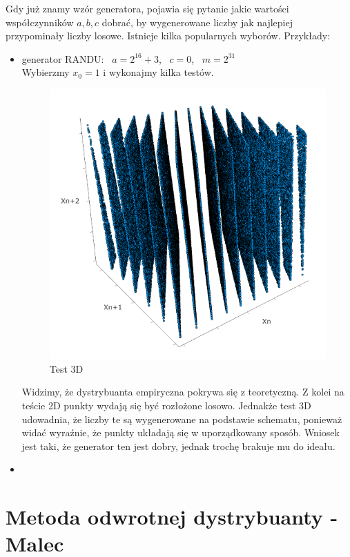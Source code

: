 \documentclass[12pt]{mwrep}
\begin{document}
	\noindent Gdy już znamy wzór generatora, pojawia się pytanie jakie wartości współczynników $a, b, c$ dobrać, by wygenerowane liczby jak najlepiej przypominały liczby losowe. Istnieje kilka popularnych wyborów. Przykłady:
	\begin{itemize}[leftmargin=10mm]
		\item generator RANDU: \ $a = 2^{16} + 3$, \ $c = 0$, \ $m = 2^{31}$\\
		Wybierzmy $x_0 = 1$ i wykonajmy kilka testów.
		\begin{figure}[H]
			\centering
			\caption{Test 3D}
			\includegraphics[scale=1]{fig/fig_generator.png}
		\end{figure}
		Widzimy, że dystrybuanta empiryczna pokrywa się z teoretyczną. Z kolei na teście 2D punkty wydają się być rozłożone losowo. Jednakże test 3D udowadnia, że liczby te są wygenerowane na podstawie schematu, ponieważ widać wyraźnie, że punkty układają się w uporządkowany sposób. Wniosek jest taki, że generator ten jest dobry, jednak trochę brakuje mu do ideału.
		\item 
	\end{itemize}


	
	\section{Metoda odwrotnej dystrybuanty - Malec}
	
\end{document}
